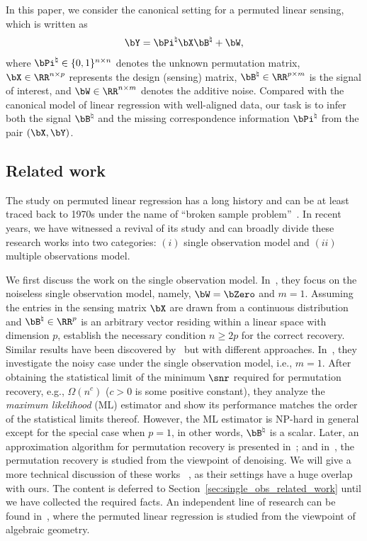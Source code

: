 \documentclass[11pt]{article}
\def \bPitrue {\bPi^{\natural}}
\def \bBtrue {\bB^{\natural}}
\begin{document}
In this paper, we consider the canonical setting for a
permuted linear sensing, which is written as
\begin{align}
\label{eq:sys_model}
\bY = \bPitrue\bX\bBtrue + \bW,
\end{align}
where $\bPitrue \in \{0, 1\}^{n\times n}$ denotes the unknown permutation matrix,
$\bX \in \RR^{n\times p}$ represents the design (sensing) matrix,
$\bBtrue \in \RR^{p\times m}$
is the signal of interest, and $\bW \in \RR^{n\times m}$ denotes the additive noise.
Compared with the canonical model of linear regression with well-aligned data, our task is to infer both the signal $\bBtrue$ and the missing correspondence information $\bPitrue$ from the pair $(\bX, \bY)$.


\subsection{Related work}

The study on permuted linear regression has a long history and
can be at least traced back to 1970s under the name of ``broken sample problem''~\citep{degroot1976matching, degroot1980estimation, goel1975re, bai2005broken}.
In recent years, we have witnessed a revival of its study and
can broadly divide these research works into
two categories: $(i)$ single observation model
and $(ii)$ multiple observations model.

We first discuss the work on the single observation model. In~\citet{unnikrishnan2015unlabeled}, they focus on the
noiseless single observation model, namely,
$\bW = \bZero$ and $m = 1$.
Assuming the entries in the sensing matrix $\bX$
are drawn from a continuous distribution and
$\bBtrue\in \RR^p$ is an arbitrary vector residing
within a linear space with dimension $p$,
\citet{unnikrishnan2015unlabeled} establish the necessary condition $n\geq 2p$
for the correct recovery.
Similar results have been discovered by~\citet{domankic2018permutations} but
with different approaches.
In~\citet{pananjady2018linear}, they investigate the noisy case under
the single observation model, i.e., $m=1$.
After obtaining the statistical limit of the minimum $\snr$
required for permutation recovery, e.g., $\Omega(n^c)$ ($c>0$ is some positive constant), they analyze the
\emph{maximum likelihood} (ML) estimator and show its performance
matches the order of the statistical limits thereof.
However, the ML estimator is NP-hard in general except for the special case when $p=1$, in other words, $\bBtrue$ is a scalar.
Later, an approximation algorithm for permutation recovery is presented in~\cite{hsu2017linear}; and in~\citet{slawski2017linear}, the permutation recovery is studied
from the viewpoint of denoising. We will give a more technical discussion of these works ~\citep{pananjady2018linear, hsu2017linear, slawski2017linear}, as their settings have a huge overlap with ours.
The content is deferred to Section~\ref{sec:single_obs_related_work} until we have collected the required facts. An independent line of research can be found in~\citet{tsakiris2019homomorphic, peng2021homomorphic}, where the
permuted linear regression is studied from the viewpoint of algebraic geometry.
\end{document}
